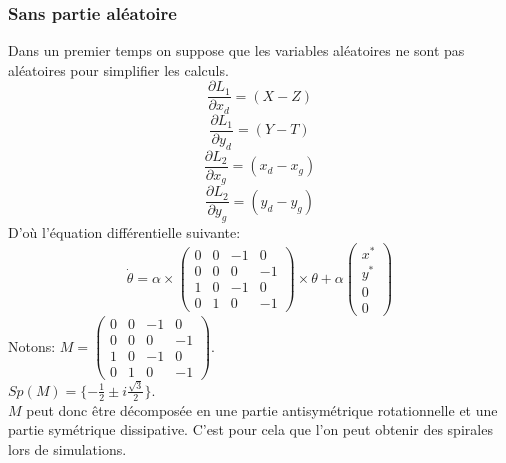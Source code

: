 \documentclass{article}
\begin{document}
\subsubsection{Sans partie aléatoire}
Dans un premier temps on suppose que les variables aléatoires ne sont pas aléatoires pour simplifier les calculs.
$$ \frac{\partial L_1}{\partial x_d} = (X - Z) $$
$$ \frac{\partial L_1}{\partial y_d} = (Y - T) $$
$$ \frac{\partial L_2}{\partial x_g} = (x_d - x_g) $$
$$ \frac{\partial L_2}{\partial y_g} = (y_d - y_g) $$
D'où l'équation différentielle suivante:
$$ \dot{\theta} = \alpha \times \begin{pmatrix}
0 & 0 & -1 & 0 \\
0 & 0 & 0 & -1 \\
1 & 0 & -1 & 0 \\
0 & 1 & 0 & -1
\end{pmatrix} \times \theta + \alpha \begin{pmatrix}
x^* \\
y^* \\
0 \\
0
\end{pmatrix} $$
Notons: $ M = \begin{pmatrix}
0 & 0 & -1 & 0 \\
0 & 0 & 0 & -1 \\
1 & 0 & -1 & 0 \\
0 & 1 & 0 & -1
\end{pmatrix} $. \\
$Sp(M) = \{ - \frac{1}{2} \pm i \frac{\sqrt{3}}{2} \}$. \\
$M$ peut donc être décomposée en une partie antisymétrique rotationnelle et une partie symétrique dissipative.
C'est pour cela que l'on peut obtenir des spirales lors de simulations.
\end{document}
